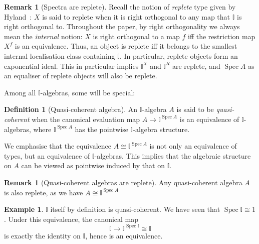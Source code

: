 \documentclass[12pt]{amsart}
\theoremstyle{definition}
\newtheorem{example}[theorem]{Example}
\newtheorem{definition}[theorem]{Definition}
\newtheorem{remark}[theorem]{Remark}
\newcommand{\mb}[1]{\mathbf{#1}}
\newcommand{\mbb}[1]{\mathbb{#1}}
\newcommand{\I}{\mbb I}
\newcommand{\alg}{\text{-}\mb{Alg}}
\newcommand{\spec}{\operatorname{Spec}}
\begin{document}
\begin{remark}[Spectra are replete]\label{rem:specarereplete}
  Recall the notion of \emph{replete} type given by Hyland~\cite{hyland1990first}: $X$ is said to replete when it is right orthogonal to any map that $\I$ is right orthogonal to. Throughout the paper, by right orthogonality we always mean the \emph{internal} notion: $X$ is right orthogonal to a map $f$ iff the restriction map $X^f$ is an equivalence. Thus, an object is replete iff it belongs to the smallest internal localisation class containing $\I$. In particular, replete objects form an exponential ideal. This in particular implies $\I^X$ and $\I^R$ are replete, and $\spec A$ as an equaliser of replete objects will also be replete.
\end{remark}

Among all $\I$-algebras, some will be special:

\begin{definition}[Quasi-coherent algebra]
  An $\I$-algebra $A$ is said to be \emph{quasi-coherent} when the canonical evaluation map $A \to \I^{\spec A}$ is an equivalence of $\I$-algebras, where $\I^{\spec A}$ has the pointwise $\I$-algebra structure.
\end{definition}

We emphasise that the equivalence $A \cong \I^{\spec A}$ is not only an equivalence of types, but an equivalence of $\I$-algebras. This implies that the algebraic structure on $A$ can be viewed as pointwise induced by that on $\I$. 

\begin{remark}[Quasi-coherent algebras are replete]\label{rem:qcreplete}
  Any quasi-coherent algebra $A$ is also replete, as we have $A\cong \I^{\spec{A}}$
\end{remark}

\begin{example}\label{exm:intervalqc}
  $\I$ itself by definition is quasi-coherent. We have seen that $\spec \I \cong 1$. Under this equivalence, the canonical map 
  \[ \I \to \I^{\spec \I} \cong \I \]
  is exactly the identity on $\I$, hence is an equivalence.
\end{example}
\end{document}
